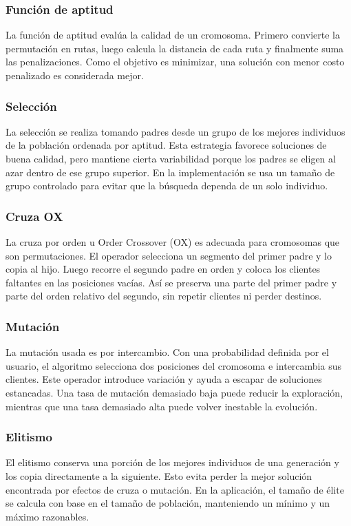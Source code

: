 \documentclass[runningheads]{llncs}
\begin{document}
\subsubsection{Funci\'on de aptitud}
La funci\'on de aptitud eval\'ua la calidad de un cromosoma. Primero convierte la
permutaci\'on en rutas, luego calcula la distancia de cada ruta y finalmente suma
las penalizaciones. Como el objetivo es minimizar, una soluci\'on con menor costo
penalizado es considerada mejor.

\subsubsection{Selecci\'on}
La selecci\'on se realiza tomando padres desde un grupo de los mejores individuos
de la poblaci\'on ordenada por aptitud. Esta estrategia favorece soluciones de
buena calidad, pero mantiene cierta variabilidad porque los padres se eligen al
azar dentro de ese grupo superior. En la implementaci\'on se usa un tama\~no de
grupo controlado para evitar que la b\'usqueda dependa de un solo individuo.

\subsubsection{Cruza OX}
La cruza por orden u Order Crossover (OX) es adecuada para cromosomas que son
permutaciones. El operador selecciona un segmento del primer padre y lo copia al
hijo. Luego recorre el segundo padre en orden y coloca los clientes faltantes en
las posiciones vac\'ias. As\'i se preserva una parte del primer padre y parte del
orden relativo del segundo, sin repetir clientes ni perder destinos.

\subsubsection{Mutaci\'on}
La mutaci\'on usada es por intercambio. Con una probabilidad definida por el
usuario, el algoritmo selecciona dos posiciones del cromosoma e intercambia sus
clientes. Este operador introduce variaci\'on y ayuda a escapar de soluciones
estancadas. Una tasa de mutaci\'on demasiado baja puede reducir la exploraci\'on,
mientras que una tasa demasiado alta puede volver inestable la evoluci\'on.

\subsubsection{Elitismo}
El elitismo conserva una porci\'on de los mejores individuos de una generaci\'on y
los copia directamente a la siguiente. Esto evita perder la mejor soluci\'on
encontrada por efectos de cruza o mutaci\'on. En la aplicaci\'on, el tama\~no de
\'elite se calcula con base en el tama\~no de poblaci\'on, manteniendo un m\'inimo y
un m\'aximo razonables.
\end{document}
